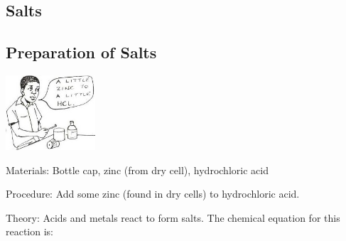 \begin{multicols}{2}

\section*{Salts} 


\subsection{Preparation of Salts}

\begin{center}
\includegraphics[width=0.25\textwidth]{./img/source/salt-acid-metal.jpg}
\end{center}

\begin{description*}
\item[Materials:]{Bottle cap, zinc (from dry cell), hydrochloric acid}
\item[Procedure:]{Add some zinc (found in dry cells) to hydrochloric acid.}
\item[Theory:]{Acids and metals react to form salts. The chemical equation for this reaction is: }
\end{description*}


\end{multicols}
